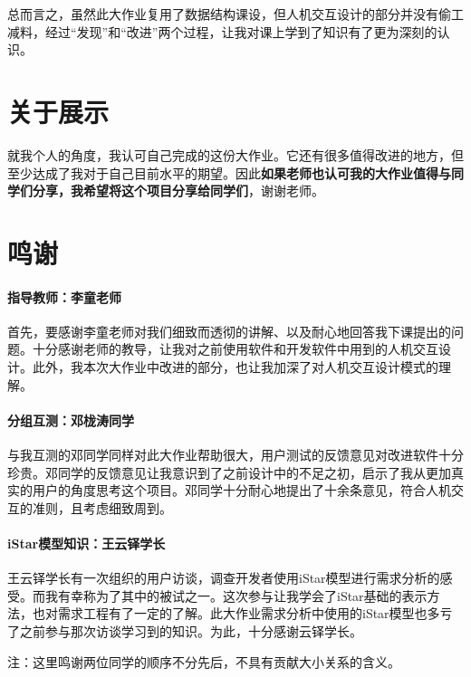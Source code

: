 \documentclass[scheme = chinese]{ctexart}
\begin{document}
总而言之，虽然此大作业复用了数据结构课设，但人机交互设计的部分并没有偷工减料，经过“发现”和“改进”两个过程，让我对课上学到了知识有了更为深刻的认识。

\section{关于展示}
就我个人的角度，我认可自己完成的这份大作业。它还有很多值得改进的地方，但至少达成了我对于自己目前水平的期望。因此\textbf{如果老师也认可我的大作业值得与同学们分享，我希望将这个项目分享给同学们}，谢谢老师。

\section{鸣谢}

\paragraph{指导教师：李童老师}
首先，要感谢李童老师对我们细致而透彻的讲解、以及耐心地回答我下课提出的问题。十分感谢老师的教导，让我对之前使用软件和开发软件中用到的人机交互设计。此外，我本次大作业中改进的部分，也让我加深了对人机交互设计模式的理解。

\paragraph{分组互测：邓栊涛同学}
与我互测的邓同学同样对此大作业帮助很大，用户测试的反馈意见对改进软件十分珍贵。邓同学的反馈意见让我意识到了之前设计中的不足之初，启示了我从更加真实的用户的角度思考这个项目。邓同学十分耐心地提出了十余条意见，符合人机交互的准则，且考虑细致周到。

\paragraph{iStar模型知识：王云铎学长}
王云铎学长有一次组织的用户访谈，调查开发者使用iStar模型进行需求分析的感受。而我有幸称为了其中的被试之一。这次参与让我学会了iStar基础的表示方法，也对需求工程有了一定的了解。此大作业需求分析中使用的iStar模型也多亏了之前参与那次访谈学习到的知识。为此，十分感谢云铎学长。

注：这里鸣谢两位同学的顺序不分先后，不具有贡献大小关系的含义。
\end{document}
